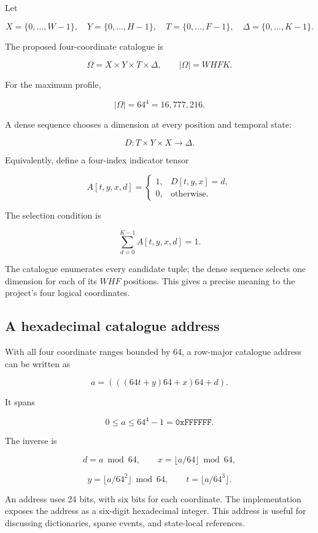 \documentclass[
  11pt,
  a4paper,
]{article}
\begin{document}
Let

\[
X=\{0,\ldots,W-1\},\quad
Y=\{0,\ldots,H-1\},\quad
T=\{0,\ldots,F-1\},\quad
\Delta=\{0,\ldots,K-1\}.
\]

The proposed four-coordinate catalogue is

\[
\Omega=X\times Y\times T\times\Delta,\qquad
|\Omega|=WHFK.
\]

For the maximum profile,

\[
|\Omega|=64^4=16{,}777{,}216.
\]

A dense sequence chooses a dimension at every position and temporal
state:

\[
D:T\times Y\times X\longrightarrow\Delta.
\]

Equivalently, define a four-index indicator tensor

\[
A[t,y,x,d]=
\begin{cases}
1,&D[t,y,x]=d,\\
0,&\text{otherwise}.
\end{cases}
\]

The selection condition is

\[
\sum_{d=0}^{K-1}A[t,y,x,d]=1.
\]

The catalogue enumerates every candidate tuple; the dense sequence
selects one dimension for each of its \(WHF\) positions. This gives a
precise meaning to the project's four logical coordinates.

\hypertarget{a-hexadecimal-catalogue-address}{%
\subsection{A hexadecimal catalogue
address}\label{a-hexadecimal-catalogue-address}}

With all four coordinate ranges bounded by 64, a row-major catalogue
address can be written as

\[
a=(((64t+y)64+x)64+d).
\]

It spans

\[
0\le a\le64^4-1=\mathtt{0xFFFFFF}.
\]

The inverse is

\[
d=a\bmod64,\qquad
x=\lfloor a/64\rfloor\bmod64,
\]

\[
y=\lfloor a/64^2\rfloor\bmod64,\qquad
t=\lfloor a/64^3\rfloor.
\]

An address uses 24 bits, with six bits for each coordinate. The
implementation exposes the address as a six-digit hexadecimal integer.
This address is useful for discussing dictionaries, sparse events, and
state-local references.
\end{document}
